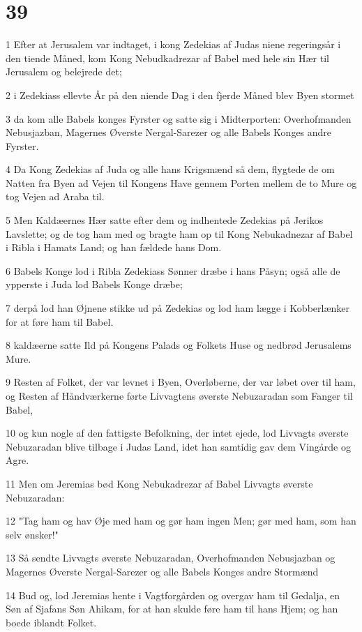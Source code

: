 \chapter{39}

\par 1 Efter at Jerusalem var indtaget, i kong Zedekias af Judas niene regeringsår i den tiende Måned, kom Kong Nebudkadrezar af Babel med hele sin Hær til Jerusalem og belejrede det;
\par 2 i Zedekiass ellevte År på den niende Dag i den fjerde Måned blev Byen stormet
\par 3 da kom alle Babels konges Fyrster og satte sig i Midterporten: Overhofmanden Nebusjazban, Magernes Øverste Nergal-Sarezer og alle Babels Konges andre Fyrster.
\par 4 Da Kong Zedekias af Juda og alle hans Krigsmænd så dem, flygtede de om Natten fra Byen ad Vejen til Kongens Have gennem Porten mellem de to Mure og tog Vejen ad Araba til.
\par 5 Men Kaldæernes Hær satte efter dem og indhentede Zedekias på Jerikos Lavslette; og de tog ham med og bragte ham op til Kong Nebukadnezar af Babel i Ribla i Hamats Land; og han fældede hans Dom.
\par 6 Babels Konge lod i Ribla Zedekiass Sønner dræbe i hans Påsyn; også alle de ypperste i Juda lod Babels Konge dræbe;
\par 7 derpå lod han Øjnene stikke ud på Zedekias og lod ham lægge i Kobberlænker for at føre ham til Babel.
\par 8 kaldæerne satte Ild på Kongens Palads og Folkets Huse og nedbrød Jerusalems Mure.
\par 9 Resten af Folket, der var levnet i Byen, Overløberne, der var løbet over til ham, og Resten af Håndværkerne førte Livvagtens øverste Nebuzaradan som Fanger til Babel,
\par 10 og kun nogle af den fattigste Befolkning, der intet ejede, lod Livvagts øverste Nebuzaradan blive tilbage i Judas Land, idet han samtidig gav dem Vingårde og Agre.
\par 11 Men om Jeremias bød Kong Nebukadrezar af Babel Livvagts øverste Nebuzaradan:
\par 12 "Tag ham og hav Øje med ham og gør ham ingen Men; gør med ham, som han selv ønsker!"
\par 13 Så sendte Livvagts øverste Nebuzaradan, Overhofmanden Nebusjazban og Magernes Øverste Nergal-Sarezer og alle Babels Konges andre Stormænd
\par 14 Bud og, lod Jeremias hente i Vagtforgården og overgav ham til Gedalja, en Søn af Sjafans Søn Ahikam, for at han skulde føre ham til hans Hjem; og han boede iblandt Folket.
